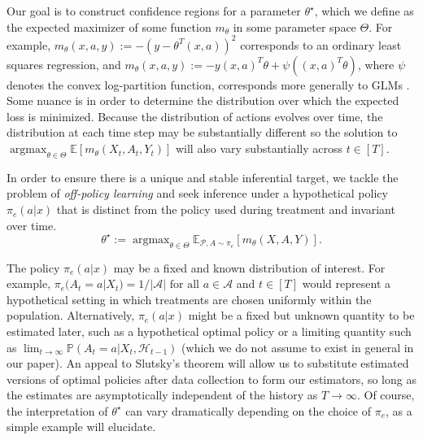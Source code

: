 \documentclass[11pt]{article}
\newcommand{\E}{\mathbb{E}}
\newcommand{\R}{\mathbb{R}}
\DeclareMathOperator*{\argmax}{argmax}
\begin{document}
Our goal is to construct confidence regions for a parameter $\theta^{\star}$, which we define as the expected maximizer of some function $m_{\theta}$ in some parameter space $\Theta$. For example, $m_{\theta}(x,a,y):= -(y -\theta^{T}(x,a))^{2}$ corresponds to an ordinary least squares regression, and $m_{\theta}(x,a,y):= -y(x,a)^{T}\theta + \psi ((x,a)^{T} \theta)$, where $\psi$ denotes the convex log-partition function, corresponds more generally to GLMs \citep{agresti2015foundations}. Some nuance is in order to determine the distribution over which the expected loss is minimized. Because the distribution of actions evolves over time, the distribution at each time step may be substantially different so the solution to  $\argmax_{\theta \in \Theta} \E\left[m_{\theta}(X_{t},A_{t},Y_{t}) \right]$ will also vary substantially across $t \in [T]$. 

In order to ensure there is a unique and stable inferential target, we tackle the problem of \emph{off-policy learning} and seek inference under a hypothetical policy $\pi_{e}(a|x)$ that is distinct from the policy used during treatment and invariant over time. 
\begin{equation} \label{eqn:theta_star}
\theta^{\star} := \argmax_{\theta \in \Theta} \mathbb{E}_{\mathcal{P}, A\sim\pi_{e}}\left[ m_{\theta}(X,A,Y) \right].
\end{equation}

The policy $\pi_{e}(a |x)$ may be a fixed and known distribution of interest. For example, $\pi_e(A_t = a| X_t) = 1 / |\mathcal{A}| \text{ for all } a \in \mathcal{A}$ and $t \in [T]$ would represent a hypothetical setting in which treatments are chosen uniformly within the population. Alternatively, $\pi_{e}(a | x)$ might be a fixed but unknown quantity to be estimated later, such as a hypothetical optimal policy or a limiting quantity such as $\lim_{t \rightarrow \infty} \mathbb{P}(A_{t}=a| X_{t}, \mathcal{H}_{t-1})$ (which we do not assume to exist in general in our paper). An appeal to Slutsky's theorem will allow us to substitute estimated versions of optimal policies after data collection to form our estimators, so long as the estimates are asymptotically independent of the history as $T \rightarrow \infty$. Of course, the interpretation of $\theta^{\star}$ can vary dramatically depending on the choice of $\pi_{e}$, as a simple example will elucidate. 
\end{document}
